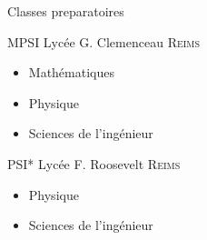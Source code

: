 \begin{frame}{Classes preparatoires}{}
    \begin{minipage}{0.25\textwidth}
        
    \end{minipage}
    \hfill
    \begin{minipage}{0.5\textwidth}
        \begin{block}{MPSI Lycée G. Clemenceau \textsc{Reims}}
            \begin{itemize}
                \item Mathématiques \\
                \item Physique \\
                \item Sciences de l'ingénieur
            \end{itemize}
        \end{block}
        \begin{block}{PSI* Lycée F. Roosevelt \textsc{Reims}}
            \begin{itemize}
                \item Physique \\
                \item Sciences de l'ingénieur
            \end{itemize}
        \end{block}
    \end{minipage}
    \hfill
    \begin{minipage}{0.25\textwidth}
        
    \end{minipage}
\end{frame}